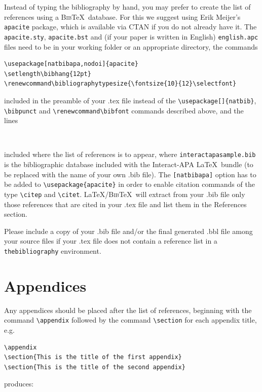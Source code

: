 \documentclass[]{interact}
\renewcommand\bibfont{\fontsize{10}{12}\selectfont}%
\theoremstyle{plain}%
\theoremstyle{definition}
\theoremstyle{remark}
\begin{document}
Instead of typing the bibliography by hand, you may prefer to create the list of references using a \textsc{Bib}\TeX\ database. For this we suggest using Erik Meijer's \texttt{apacite} package, which is available via CTAN if you do not already have it. The \verb"apacite.sty", \verb"apacite.bst" and (if your paper is written in English) \verb"english.apc" files need to be in your working folder or an appropriate directory, the commands
\begin{verbatim}
\usepackage[natbibapa,nodoi]{apacite}
\setlength\bibhang{12pt}
\renewcommand\bibliographytypesize{\fontsize{10}{12}\selectfont}
\end{verbatim}
included in the preamble of your .tex file instead of the \verb"\usepackage[]{natbib}", \verb"\bibpunct" and \verb"\renewcommand\bibfont" commands described above, and the lines
\begin{verbatim}


\end{verbatim}
included where the list of references is to appear, where \texttt{interactapasample.bib} is the bibliographic database included with the \textsf{Interact}-APA \LaTeX\ bundle (to be replaced with the name of your own .bib file). The \verb"[natbibapa]" option has to be added to \verb"\usepackage{apacite}" in order to enable citation commands of the type \verb"\citep" and \verb"\citet". \LaTeX/\textsc{Bib}\TeX\ will extract from your .bib file only those references that are cited in your .tex file and list them in the References section.

Please include a copy of your .bib file and/or the final generated .bbl file among your source files if your .tex file does not contain a reference list in a \texttt{thebibliography} environment.


\section{Appendices}

Any appendices should be placed after the list of references, beginning with the command \verb"\appendix" followed by the command \verb"\section" for each appendix title, e.g.
\begin{verbatim}
\appendix
\section{This is the title of the first appendix}
\section{This is the title of the second appendix}
\end{verbatim}
produces:\medskip
\end{document}
